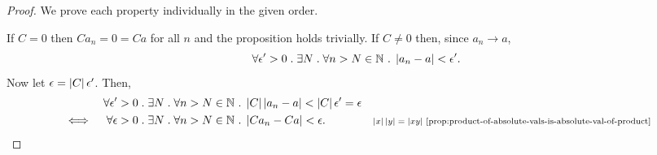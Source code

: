 \documentclass[../MathsNotesBase.tex]{subfiles}
\begin{document}
{		
	
		\nl[40]
		\begin{proof}
			We prove each property individually in the given order.
			
			If $ C = 0 $ then $ Ca_n = 0 = Ca $ for all $n$ and the proposition holds trivially. If $ C \neq 0 $ then, since $a_n \to a$,
			\[ \forall \epsilon' > 0 \;.\; \exists N \;.\; \forall n > N \in \mathbb{N}^{} \;.\; \left\lvert a_n - a\right\rvert < \epsilon'. \]
			Now let $ \epsilon = \left\lvert C\right\rvert\epsilon' $. Then,
			\begin{align*}
				&& \forall \epsilon' > 0 \;.\; \exists N \;.\; \forall n > N \in \mathbb{N}^{} &\;.\; \left\lvert C\right\rvert\left\lvert a_n - a\right\rvert < \left\lvert C\right\rvert\epsilon' = \epsilon  \\
				&\iff & \forall \epsilon > 0 \;.\; \exists N \;.\; \forall n > N \in \mathbb{N}^{} &\;.\; \left\lvert Ca_n - Ca\right\rvert < \epsilon. &\text{\scriptsize{$\left\lvert x\right\rvert\left\lvert y\right\rvert = \left\lvert xy\right\rvert$ \ref{prop:product-of-absolute-vals-is-absolute-val-of-product}}} \\
			\end{align*}
			

\end{proof}}
\end{document}
